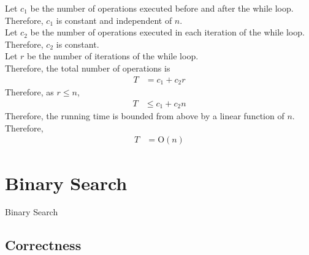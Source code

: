 \documentclass[titlepage, fleqn, a4paper, 12pt, twoside]{article}
\theoremstyle{definition}
\theoremstyle{theorem}
\let\And\relax
\begin{document}
Let $c_1$ be the number of operations executed before and after the while loop.
Therefore, $c_1$ is constant and independent of $n$.\\
Let $c_2$ be the number of operations executed in each iteration of the while loop.
Therefore, $c_2$ is constant.\\
Let $r$ be the number of iterations of the while loop.\\
Therefore, the total number of operations is
\begin{align*}
	T & = c_1 + c_2 r
\end{align*}
Therefore, as $r \le n$,
\begin{align*}
	T & \le c_1 + c_2 n
\end{align*}
Therefore, the running time is bounded from above by a linear function of $n$.
Therefore,
\begin{align*}
	T & = \mathrm{O}(n)
\end{align*}

\section{Binary Search}

\begin{algorithm}
	\begin{algorithmic}[1]
		\Statex
		\While{$\texttt{found} = \False \And \texttt{min} \le \texttt{max} $}
			\Else
			\EndIf
		\EndWhile
		\Else
		\EndIf
		\EndFunction
	\end{algorithmic}
	\caption{Binary Search}
	\label{alg:Binary_Search}
\end{algorithm}

\subsection{Correctness}
\end{document}
